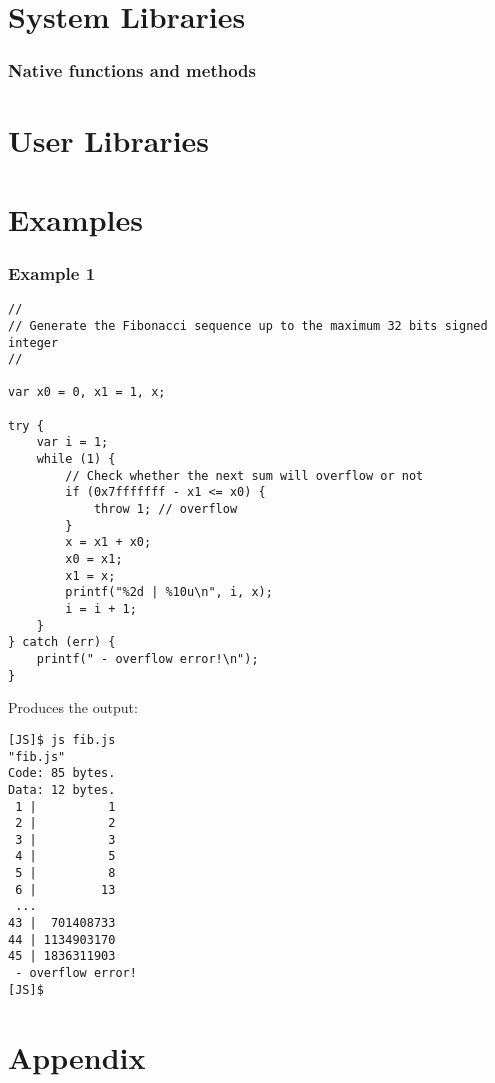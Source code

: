 \section {System Libraries}

\subsubsection{Native functions and methods}

\section {User Libraries}

\section {Examples}

\subsubsection{Example 1}

\begin{lstlisting}[language=uJS]
//
// Generate the Fibonacci sequence up to the maximum 32 bits signed integer
//

var x0 = 0, x1 = 1, x;

try {
    var i = 1;
    while (1) {
        // Check whether the next sum will overflow or not
        if (0x7fffffff - x1 <= x0) {
            throw 1; // overflow
        }
        x = x1 + x0;
        x0 = x1;
        x1 = x;
        printf("%2d | %10u\n", i, x);
        i = i + 1;
    }
} catch (err) {
    printf(" - overflow error!\n");
}
\end{lstlisting}
Produces the output:

\begin{lstlisting}[language=Console]
[JS]$ js fib.js
"fib.js"
Code: 85 bytes.
Data: 12 bytes.
 1 |          1
 2 |          2
 3 |          3
 4 |          5
 5 |          8
 6 |         13
 ...
43 |  701408733
44 | 1134903170
45 | 1836311903
 - overflow error!
[JS]$
\end{lstlisting}

\section{Appendix}



